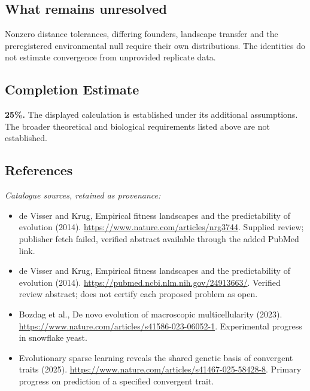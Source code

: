 \documentclass[11pt]{article}
\begin{document}
\subsection{What remains unresolved}
Nonzero distance tolerances, differing founders, landscape transfer and the preregistered environmental null require their own distributions. The identities do not estimate convergence from unprovided replicate data.
\subsection{Completion Estimate}
\textbf{25\%.} The displayed calculation is established under its additional assumptions. The broader theoretical and biological requirements listed above are not established.
\subsection{References}
\noindent\emph{Catalogue sources, retained as provenance:}
\begin{itemize}
\item de Visser and Krug, Empirical fitness landscapes and the predictability of evolution (2014). \url{https://www.nature.com/articles/nrg3744}. Supplied review; publisher fetch failed, verified abstract available through the added PubMed link.
\item de Visser and Krug, Empirical fitness landscapes and the predictability of evolution (2014). \url{https://pubmed.ncbi.nlm.nih.gov/24913663/}. Verified review abstract; does not certify each proposed problem as open.
\item Bozdag et al., De novo evolution of macroscopic multicellularity (2023). \url{https://www.nature.com/articles/s41586-023-06052-1}. Experimental progress in snowflake yeast.
\item Evolutionary sparse learning reveals the shared genetic basis of convergent traits (2025). \url{https://www.nature.com/articles/s41467-025-58428-8}. Primary progress on prediction of a specified convergent trait.
\end{itemize}
\clearpage


\appendix
\end{document}
